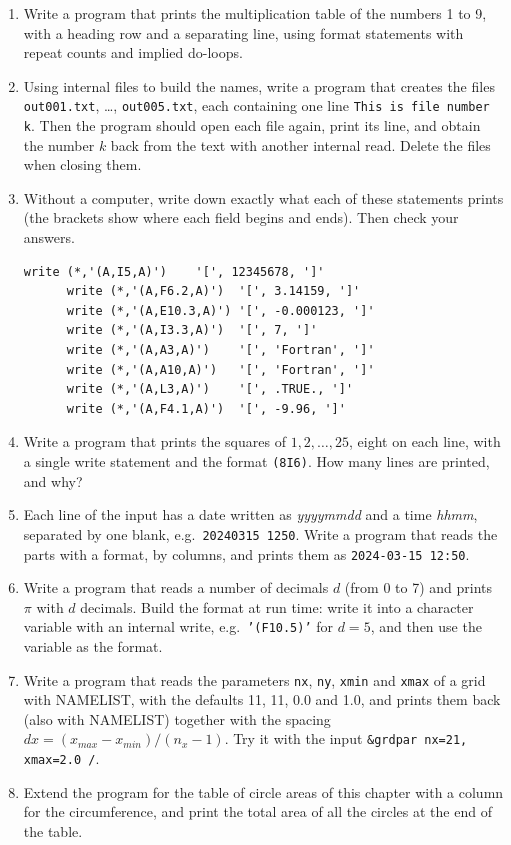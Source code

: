 \begin{enumerate}
    \item Write a program that prints the multiplication table of the numbers 1 to 9, with a heading row and a separating line, using format statements with repeat counts and implied do-loops.
    \item Using internal files to build the names, write a program that creates the files \texttt{out001.txt}, \ldots, \texttt{out005.txt}, each containing one line \texttt{This is file number k}. Then the program should open each file again, print its line, and obtain the number $k$ back from the text with another internal read. Delete the files when closing them.
    \item Without a computer, write down exactly what each of these statements prints (the brackets show where each field begins and ends). Then check your answers.

\begin{lstlisting}[style=fortran77]
      write (*,'(A,I5,A)')    '[', 12345678, ']'
      write (*,'(A,F6.2,A)')  '[', 3.14159, ']'
      write (*,'(A,E10.3,A)') '[', -0.000123, ']'
      write (*,'(A,I3.3,A)')  '[', 7, ']'
      write (*,'(A,A3,A)')    '[', 'Fortran', ']'
      write (*,'(A,A10,A)')   '[', 'Fortran', ']'
      write (*,'(A,L3,A)')    '[', .TRUE., ']'
      write (*,'(A,F4.1,A)')  '[', -9.96, ']'
\end{lstlisting}

    \item Write a program that prints the squares of $1, 2, \ldots, 25$, eight on each line, with a single write statement and the format \texttt{(8I6)}. How many lines are printed, and why?
    \item Each line of the input has a date written as \emph{yyyymmdd} and a time \emph{hhmm}, separated by one blank, e.g.\ \texttt{20240315 1250}. Write a program that reads the parts with a format, by columns, and prints them as \texttt{2024-03-15  12:50}.
    \item Write a program that reads a number of decimals $d$ (from 0 to 7) and prints $\pi$ with $d$ decimals. Build the format at run time: write it into a character variable with an internal write, e.g.\ \texttt{'(F10.5)'} for $d = 5$, and then use the variable as the format.
    \item Write a program that reads the parameters \texttt{nx}, \texttt{ny}, \texttt{xmin} and \texttt{xmax} of a grid with NAMELIST, with the defaults 11, 11, 0.0 and 1.0, and prints them back (also with NAMELIST) together with the spacing $dx = (x_{max} - x_{min})/(n_x - 1)$. Try it with the input \texttt{\&grdpar nx=21, xmax=2.0 /}.
    \item Extend the program for the table of circle areas of this chapter with a column for the circumference, and print the total area of all the circles at the end of the table.
\end{enumerate}
